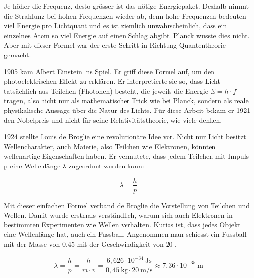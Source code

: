 	 
	Je höher die Frequenz, desto grösser ist das nötige Energiepaket. 
	Deshalb nimmt die Strahlung bei hohen Frequenzen wieder ab, denn hohe Frequenzen bedeuten viel Energie pro Lichtquant und es ist ziemlich unwahrscheinlich, dass ein einzelnes Atom so viel Energie auf einen Schlag abgibt. 
	Planck wusste dies nicht. 
	Aber mit dieser Formel war der erste Schritt in Richtung  Quantentheorie gemacht.

	
	
	
	1905 kam Albert Einstein ins Spiel. 
	Er griff diese Formel auf, um den photoelektrischen Effekt zu erklären. 
	Er interpretierte sie so, dass Licht tatsächlich aus Teilchen (Photonen) besteht, die jeweils die Energie $E = h \cdot f$ tragen, also nicht nur als mathematischer Trick wie bei Planck, sondern als reale physikalische Aussage über die Natur des Lichts.
	Für diese Arbeit bekam er 1921 den Nobelpreis und nicht für seine Relativitätstheorie, wie viele denken.
	
	 
	
	

	
	1924 stellte Louis de Broglie eine revolutionäre Idee vor.
	Nicht nur Licht besitzt Wellencharakter, auch Materie, also Teilchen wie Elektronen, könnten wellenartige Eigenschaften haben.
	Er vermutete, dass jedem Teilchen mit Impuls p eine Wellenlänge λ zugeordnet werden kann:
	
	\begin{equation}
		\lambda = \frac{h}{p}
	\end{equation}	
	
	Mit dieser einfachen Formel verband de Broglie die Vorstellung von Teilchen und Wellen. Damit wurde erstmals verständlich, warum sich auch Elektronen in bestimmten Experimenten wie Wellen verhalten.
	Kurios ist, dass jedes Objekt eine Wellenlänge hat, auch ein Fussball.
	Angenommen man schiesst ein Fussball mit der Masse von 0.45  mit der Geschwindigkeit von 20 .
	
	\begin{equation}
		\lambda = \frac{h}{p} = \frac{h}{m \cdot v} = 	\frac{6{,}626 \cdot 10^{-34} \ \text{Js}}{0{,}45 \ \text{kg} \cdot 20 \ \text{m/s}} \approx 7{,}36 \cdot 10^{-35} \ \text{m}
	\end{equation}	
	
